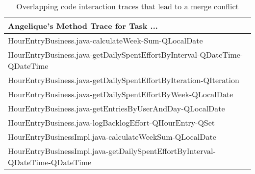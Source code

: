 \begin{table}[t!]
\centering\small
\caption{Overlapping code interaction traces that lead to a merge conflict}
\begin{tabular}{@{\hspace{2pt}}l@{\hspace{2pt}}}
\toprule
Angelique's Method Trace for Task ... \\%
\midrule
     HourEntryBusiness.java-calculateWeek-Sum-QLocalDate                                                                  \\%
     HourEntryBusiness.java-getDailySpentEffortByInterval-QDateTime-QDateTime                                    \\%
     HourEntryBusiness.java-getDailySpentEffortByIteration-QIteration                                                     \\%
     HourEntryBusiness.java-getDailySpentEffortByWeek-QLocalDate                                                           \\%
     HourEntryBusiness.java-getEntriesByUserAndDay-QLocalDate                                                            \\%
     HourEntryBusiness.java-logBacklogEffort-QHourEntry-QSet                                              \\%
     HourEntryBusinessImpl.java-calculateWeekSum-QLocalDate                                                   \\%
     HourEntryBusinessImpl.java-getDailySpentEffortByInterval-QDateTime-QDateTime                                  \\%

\end{tabular}
\end{table}
